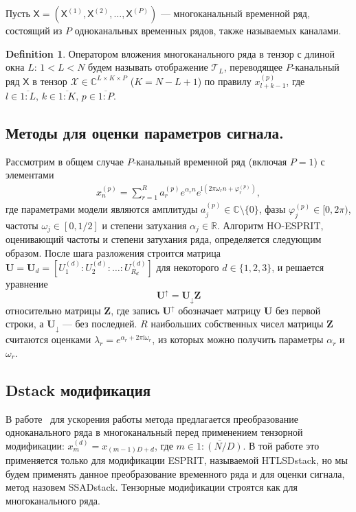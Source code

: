 \documentclass[12pt]{article}
\newcommand{\tX}{\mathsf{X}}
\newcommand{\calX}{\mathcal{X}}
\newcommand{\calT}{\mathcal{T}}
\newcommand{\iu}{\mathrm{i}}
\theoremstyle{definition}
\newtheorem{definition}{Definition}
\theoremstyle{remark}
\begin{document}
Пусть $\tX = (\tX^{(1)}, \tX^{(2)}, \ldots, \tX^{(P)})$ --- многоканальный
временной ряд, состоящий из $P$ одноканальных временных рядов, также
называемых каналами.
\begin{definition}
  Оператором вложения многоканального ряда в тензор с длиной окна $L$:
  ${1< L < N}$ будем называть отображение $\calT_{L}$, переводящее $P$-канальный
  ряд $\tX$ в тензор $\calX \in \mathbb{C}^{L\times K \times P}$
  (${K = N - L + 1}$)
  по правилу $x_{l+k-1}^{(p)}$, где $l \in \overline{1:L},\, k \in
  \overline{1:K},\, p \in \overline{1:P}$.
\end{definition}

\subsection{Методы для оценки параметров сигнала.}
Рассмотрим в общем случае $P$-канальный временной ряд (включая
$P=1$) с элементами
\begin{gather*}
  x_n^{(p)}= \sum_{r=1}^{R} a_r^{(p)} e^{\alpha_r n} e^{\iu\left(2\pi
  \omega_r n + \varphi_r^{(p)}\right)},
\end{gather*}
где параметрами модели являются амплитуды $a_j^{(p)} \in
\mathbb{C}\setminus\{0\}$, фазы ${\varphi_j^{(p)} \in [0, 2\pi)}$,
частоты $\omega_j\in [0, 1/2]$ и степени затухания $\alpha_j \in \mathbb{R}$.
Алгоритм HO-ESPRIT, оценивающий частоты и степени затухания ряда,
определяется следующим образом.
После шага разложения
строится матрица $\mathbf{U} = \mathbf{U}_d = \left[U_1^{(d)} :
U_2^{(d)}:\ldots : U_{R_d}^{(d)}\right]$ для некоторого $d\in \{1, 2,
3\}$, и решается уравнение
\begin{equation*}
  \mathbf{U}^{\uparrow}=\mathbf{U}_{\downarrow}\mathbf{Z}
\end{equation*}
относительно матрицы $\mathbf{Z}$, где запись $\mathbf{U}^{\uparrow}$ обозначает
матрицу $\mathbf{U}$ без первой строки, а $\mathbf{U}_{\downarrow}$
--- без последней.
$R$ наибольших собственных чисел матрицы $\mathbf{Z}$ считаются
оценками $\lambda_r = e^{\alpha_r + 2\pi\iu \omega_r}$, из которых
можно получить параметры $\alpha_r$ и $\omega_r$.

\subsection{Dstack модификация}
В работе~\cite{Papy2009} для ускорения работы метода предлагается
преобразование одноканального ряда в многоканальный перед применением
тензорной модификации: $x_m^{(d)} = x_{(m-1)D + d}$, где $m \in
\overline{1:(N/D)}$. В той работе это применяется только для
модификации \linebreak ESPRIT, называемой HTLSDstack, но мы будем применять
данное преобразование временного ряда и для оценки сигнала, метод
назовем SSADstack. Тензорные модификации строятся как для многоканального ряда.
\end{document}

